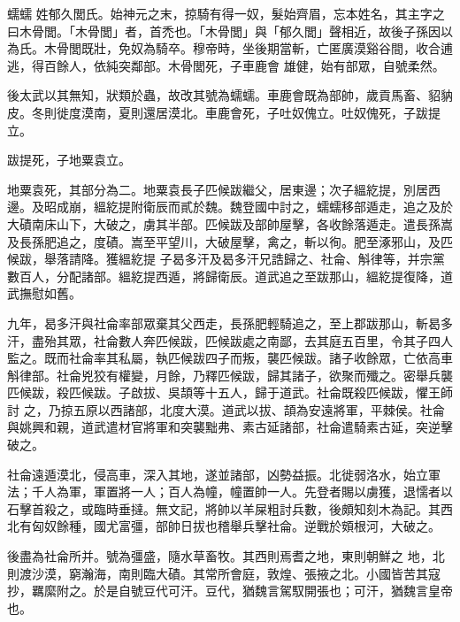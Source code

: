 
\begin{pinyinscope}

 蠕蠕
 姓郁久閭氏。始神元之末，掠騎有得一奴，髮始齊眉，忘本姓名，其主字之曰木骨閭。「木骨閭」者，首禿也。「木骨閭」與「郁久閭」聲相近，故後子孫因以為氏。木骨閭既壯，免奴為騎卒。穆帝時，坐後期當斬，亡匿廣漠谿谷間，收合逋逃，得百餘人，依純突鄰部。木骨閭死，子車鹿會
 雄健，始有部眾，自號柔然。



 後太武以其無知，狀類於蟲，故改其號為蠕蠕。車鹿會既為部帥，歲貢馬畜、貂豽皮。冬則徙度漠南，夏則還居漠北。車鹿會死，子吐奴傀立。吐奴傀死，子跋提立。



 跋提死，子地粟袁立。



 地粟袁死，其部分為二。地粟袁長子匹候跋繼父，居東邊；次子縕紇提，別居西邊。及昭成崩，縕紇提附衛辰而貳於魏。魏登國中討之，蠕蠕移部遁走，追之及於大磧南床山下，大破之，虜其半部。匹候跋及部帥屋擊，各收餘落遁走。遣長孫嵩及長孫肥追之，度磧。嵩至平望川，大破屋擊，禽之，斬以徇。肥至涿邪山，及匹候跋，舉落請降。獲縕紇提
 子曷多汗及曷多汗兄誥歸之、社侖、斛律等，并宗黨數百人，分配諸部。縕紇提西遁，將歸衛辰。道武追之至跋那山，縕紇提復降，道武撫慰如舊。



 九年，曷多汗與社侖率部眾棄其父西走，長孫肥輕騎追之，至上郡跋那山，斬曷多汗，盡殆其眾，社侖數人奔匹候跋，匹候跋處之南鄙，去其庭五百里，令其子四人監之。既而社侖率其私屬，執匹候跋四子而叛，襲匹候跋。諸子收餘眾，亡依高車斛律部。社侖兇狡有權變，月餘，乃釋匹候跋，歸其諸子，欲聚而殲之。密舉兵襲匹候跋，殺匹候跋。子啟拔、吳頡等十五人，歸于道武。社侖既殺匹候跋，懼王師討
 之，乃掠五原以西諸部，北度大漠。道武以拔、頡為安遠將軍，平棘侯。社侖與姚興和親，道武遣材官將軍和突襲黜弗、素古延諸部，社侖遣騎素古延，突逆擊破之。



 社侖遠遁漠北，侵高車，深入其地，遂並諸部，凶勢益振。北徙弱洛水，始立軍法；千人為軍，軍置將一人；百人為幢，幢置帥一人。先登者賜以虜獲，退懦者以石擊首殺之，或臨時垂撻。無文記，將帥以羊屎粗討兵數，後頗知刻木為記。其西北有匈奴餘種，國尤富彊，部帥日拔也稽舉兵擊社侖。逆戰於頞根河，大破之。



 後盡為社侖所并。號為彊盛，隨水草畜牧。其西則焉耆之地，東則朝鮮之
 地，北則渡沙漠，窮瀚海，南則臨大磧。其常所會庭，敦煌、張掖之北。小國皆苦其寇抄，羈縻附之。於是自號豆代可汗。豆代，猶魏言駕馭開張也；可汗，猶魏言皇帝也。




\end{pinyinscope}

